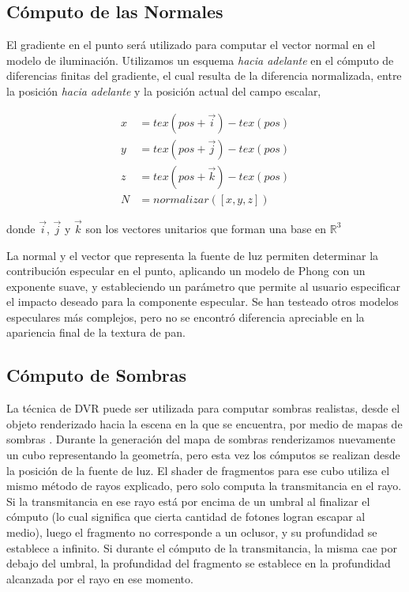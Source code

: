 \subsection{Cómputo de las Normales}
El gradiente en el punto será utilizado para computar el vector normal en el modelo de iluminación.
Utilizamos un esquema {\em hacia adelante} en el cómputo de diferencias finitas del gradiente, el cual resulta de la diferencia normalizada, entre la posición {\em hacia adelante} y la posición actual del campo escalar,


\begin{equation}
\begin{aligned}
x &= tex(pos+\vec{i}) - tex(pos)\\
y &= tex(pos+\vec{j}) - tex(pos)\\
z &= tex(pos+\vec{k}) - tex(pos) \\
N &= normalizar([x,y,z])
\end{aligned}
\end{equation}

\noindent donde $\vec{i}$, $\vec{j}$ y $\vec{k}$ son los vectores unitarios que forman una base en $\mathbb{R}^{3}$

La normal y el vector que representa la fuente de luz permiten determinar la contribución especular en el punto, aplicando un modelo de Phong con un exponente suave, y estableciendo un parámetro que permite al usuario especificar el impacto deseado para la componente especular.
Se han testeado otros modelos especulares más complejos, pero no se encontró diferencia apreciable en la apariencia final de la textura de pan.

\subsection{Cómputo de Sombras}
La técnica de DVR puede ser utilizada para computar sombras realistas, desde el objeto renderizado hacia la escena en la que se encuentra, por medio de mapas de sombras \cite{Williams1978}.
Durante la generación del mapa de sombras renderizamos nuevamente un cubo representando la geometría, pero esta vez los cómputos se realizan desde la posición de la fuente de luz.
El shader de fragmentos para ese cubo utiliza el mismo método de rayos explicado, pero solo computa la transmitancia en el rayo.
Si la transmitancia en ese rayo está por encima de un umbral al finalizar el cómputo (lo cual significa que cierta cantidad de fotones logran escapar al medio), luego el fragmento no corresponde a un oclusor, y su profundidad se establece a infinito.
Si durante el cómputo de la transmitancia, la misma cae por debajo del umbral, la profundidad del fragmento se establece en la profundidad alcanzada por el rayo en ese momento.

